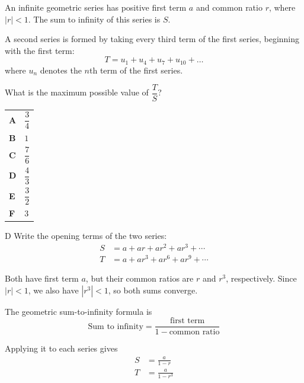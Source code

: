 \documentclass[11pt,a4paper]{article}
\begin{document}
\begin{enumerate}[label=\textbf{\arabic*.},leftmargin=*,itemsep=0pt,start=5]
An infinite geometric series has positive first term $a$ and common ratio $r$, where $|r| < 1$.
The sum to infinity of this series is $S$.

A second series is formed by taking every third term of the first series, beginning with the first term:
\[ T = u_1 + u_4 + u_7 + u_{10} + \dots \]
where $u_n$ denotes the $n$th term of the first series.\vspace*{3pt}

What is the maximum possible value of $\dfrac{T}{S}$?

\par\vspace*{12pt}
\begin{tabularx}{\linewidth}{@{}>{\bfseries}l Y@{}}
A &
$\dfrac{3}{4}$
\\[0.8em]
B &
$1$
\\[0.8em]
C &
$\dfrac{7}{6}$
\\[0.8em]
D &
$\dfrac{4}{3}$
\\[0.8em]
E &
$\dfrac{3}{2}$
\\[0.8em]
F &
$3$
\\
\end{tabularx}

\begin{djsSolution}{D}
Write the opening terms of the two series:
\[
\begin{aligned}
S&=a+ar+ar^2+ar^3+\cdots\\[5pt]
T&=a+ar^3+ar^6+ar^9+\cdots
\end{aligned}
\]

Both have first term $a$, but their common ratios are $r$ and $r^3$, respectively. Since $|r|<1$, we also have $|r^3|<1$, so both sums converge.

The geometric sum-to-infinity formula is
\[
\text{Sum to infinity}=\frac{\text{first term}}{1-\text{common ratio}}
\]

Applying it to each series gives
\[
\begin{aligned}
S&=\frac{a}{1-r}\\[8pt]
T&=\frac{a}{1-r^3}
\end{aligned}
\]


\end{djsSolution}
\end{enumerate}
\end{document}

